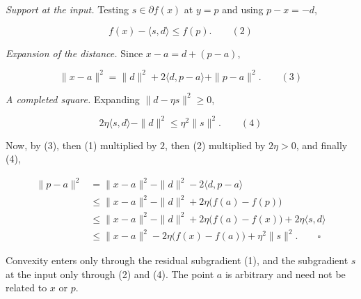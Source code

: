 \documentclass[11pt,a4paper]{article}
\begin{document}
\emph{Support at the input.} Testing \(s\in\partial f(x)\) at \(y=p\) and using \(p-x=-d\),


\[f(x)-\langle s,d\rangle\le f(p).\qquad(2)\]


\emph{Expansion of the distance.} Since \(x-a=d+(p-a)\),


\[\|x-a\|^2=\|d\|^2+2\langle d,p-a\rangle+\|p-a\|^2.\qquad(3)\]


\emph{A completed square.} Expanding \(\|d-\eta s\|^2\ge0\),


\[2\eta\langle s,d\rangle-\|d\|^2\le\eta^2\|s\|^2.\qquad(4)\]


Now, by (3), then (1) multiplied by \(2\), then (2) multiplied by \(2\eta>0\), and finally (4),


\[\begin{aligned}
\|p-a\|^2&=\|x-a\|^2-\|d\|^2-2\langle d,p-a\rangle\\
&\le\|x-a\|^2-\|d\|^2+2\eta\bigl(f(a)-f(p)\bigr)\\
&\le\|x-a\|^2-\|d\|^2+2\eta\bigl(f(a)-f(x)\bigr)+2\eta\langle s,d\rangle\\
&\le\|x-a\|^2-2\eta\bigl(f(x)-f(a)\bigr)+\eta^2\|s\|^2. \qquad\square
\end{aligned}\]


Convexity enters only through the residual subgradient (1), and the subgradient \(s\) at the input only through (2) and (4). The point \(a\) is arbitrary and need not be related to \(x\) or \(p\).
\end{document}
